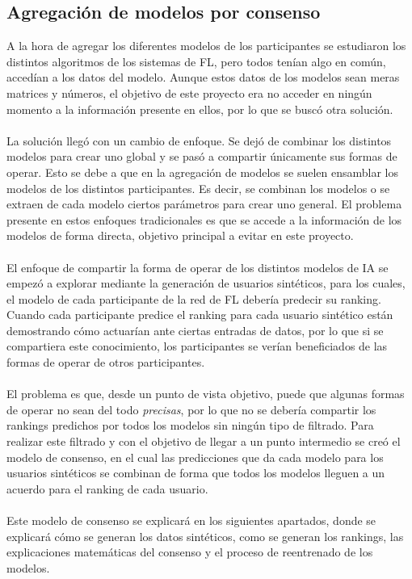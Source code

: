 \subsection{Agregación de modelos por consenso}\label{Consenso}
A la hora de agregar los diferentes modelos de los participantes se estudiaron los distintos algoritmos de los sistemas de FL, pero todos tenían algo en común, accedían a los datos del modelo. Aunque estos datos de los modelos sean meras matrices y números, el objetivo de este proyecto era no acceder en ningún momento a la información presente en ellos, por lo que se buscó otra solución.
\\ \\
La solución llegó con un cambio de enfoque. Se dejó de combinar los distintos modelos para crear uno global y se pasó a compartir únicamente sus formas de operar. Esto se debe a que en la agregación de modelos se suelen ensamblar los modelos de los distintos participantes. Es decir, se combinan los modelos o se extraen de cada modelo ciertos parámetros para crear uno general. El problema presente en estos enfoques tradicionales es que se accede a la información de los modelos de forma directa, objetivo principal a evitar en este proyecto.
\\ \\
El enfoque de compartir la forma de operar de los distintos modelos de IA se empezó a explorar mediante la generación de usuarios sintéticos, para los cuales, el modelo de cada participante de la red de FL debería predecir su ranking. Cuando cada participante predice el ranking para cada usuario sintético están demostrando cómo actuarían ante ciertas entradas de datos, por lo que si se compartiera este conocimiento, los participantes se verían beneficiados de las formas de operar de otros participantes.
\\ \\
El problema es que, desde un punto de vista objetivo, puede que algunas formas de operar no sean del todo \textit{precisas}, por lo que no se debería compartir los rankings predichos por todos los modelos sin ningún tipo de filtrado. Para realizar este filtrado y con el objetivo de llegar a un punto intermedio se creó el modelo de consenso, en el cual las predicciones que da cada modelo para los usuarios sintéticos se combinan de forma que todos los modelos lleguen a un acuerdo para el ranking de cada usuario. 
\\ \\
Este modelo de consenso se explicará en los siguientes apartados, donde se explicará cómo se generan los datos sintéticos, como se generan los rankings, las explicaciones matemáticas del consenso y el proceso de reentrenado de los modelos.

